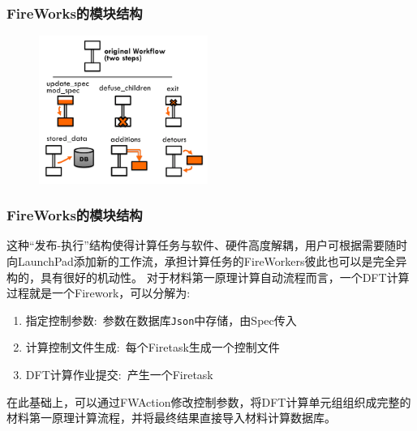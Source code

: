 {{\frame
{
	\frametitle{\textrm{FireWorks}的模块结构}
\fontsize{8.2pt}{6.2pt}
\begin{figure}[h!]
\centering
\vspace*{-0.10in}
\includegraphics[height=1.9in]{Figures/MP_Fireworks_fwactions.png}
\caption{\fontsize{7.2pt}{4.2pt}}%
\label{FireWorks_FWA}
\end{figure} 
}

\frame
{
	\frametitle{\textrm{FireWorks}的模块结构}
这种“发布-执行”结构使得计算任务与软件、硬件高度解耦，用户可根据需要随时向\textrm{LaunchPad}添加新的工作流，承担计算任务的\textrm{FireWorkers}彼此也可以是完全异构的，具有很好的机动性。
\vskip 0.25in
对于材料第一原理计算自动流程而言，一个\textrm{DFT}计算过程就是一个\textrm{Firework}，可以分解为:
\begin{enumerate}
	\item 指定控制参数:~参数在数据库\texttt{Json}中存储，由\textrm{Spec}传入
	\item 计算控制文件生成:~每个\textrm{Firetask}生成一个控制文件
	\item \textrm{DFT}计算作业提交:~产生一个\textrm{Firetask}
\end{enumerate}
在此基础上，可以通过\textrm{FWAction}修改控制参数，将\textrm{DFT}计算单元组组织成完整的材料第一原理计算流程，并将最终结果直接导入材料计算数据库。
}

}}
